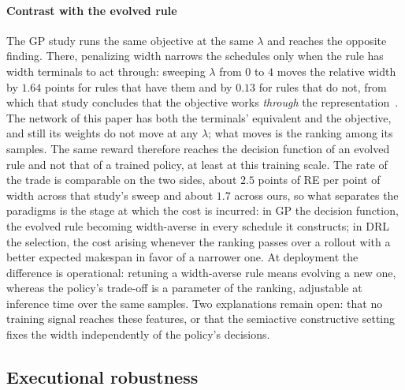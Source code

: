 \documentclass[preprint,12pt]{elsarticle}
\theoremstyle{definition}
\theoremstyle{remark}
\begin{document}
\paragraph{Contrast with the evolved rule} The GP study runs
the same objective at the same $\lambda$ and reaches the opposite
finding. There, penalizing width narrows the schedules only when the
rule has width terminals to act through: sweeping $\lambda$ from $0$
to $4$ moves the relative width by $1.64$ points for rules that have
them and by $0.13$ for rules that do not, from which that study
concludes that the objective works \emph{through} the
representation~\citep{DiazGP2026}. The network of this paper has
both the terminals' equivalent and the objective, and still its
weights do not move at any $\lambda$; what moves is the ranking
among its samples. The same reward therefore reaches the decision
function of an evolved rule and not that of a trained policy, at
least at this training scale. The rate of the trade is comparable on
the two sides, about $2.5$ points of RE per point of width across
that study's sweep and about $1.7$ across ours, so what separates
the paradigms is the stage at which the cost is incurred: in GP the
decision function, the evolved rule becoming width-averse in every
schedule it constructs; in DRL the selection, the cost arising
whenever the ranking passes over a rollout with a better expected
makespan in favor of a narrower one. At deployment the difference is
operational: retuning a width-averse rule means evolving a new one,
whereas the policy's trade-off is a parameter of the ranking,
adjustable at inference time over the same samples. Two explanations
remain open: that no training signal reaches these features, or that
the semiactive constructive setting fixes the width independently of
the policy's decisions.

\FloatBarrier
\subsection{Executional robustness}
\label{sec:results-eps}
\end{document}
